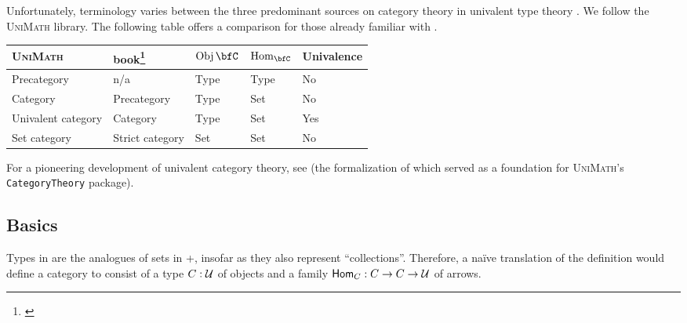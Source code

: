 \documentclass[a5paper]{article}
\newcommand{\software}[1]{{\textsc{#1}}\index{#1}}
\newcommand{\UniMath}{\software{UniMath}}
\begin{document}
Unfortunately, terminology varies between the three predominant sources on
category theory in univalent type theory \cite{book} \cite{unimath}
\cite{hott-lib}. We follow the \UniMath{} library. The
following table offers a comparison for those already familiar with \cite{book}.
\begin{center}
  \begin{tabular}{| l | l | l | l | l |}
    \hline
    \UniMath{} & \HoTT{} book\footnote{\cite{book}} & $\Obj\bfC$ & $\Hom_{\bfC}$ & Univalence \\ \hline
    Precategory                  & n/a             & Type & Type  & No \\
    Category                     & Precategory     & Type & Set   & No \\
    Univalent category           & Category        & Type & Set   & Yes \\
    Set category                 & Strict category & Set  & Set   & No \\
    \hline
  \end{tabular}
\end{center}
For a pioneering development of univalent category theory, see \cite{rezk} (the
formalization of which served as a foundation for \UniMath{}'s
\texttt{CategoryTheory} package). 

\subsection{Basics}
\label{subsec:basics}

Types in \UTT{} are the analogues of sets in \ZFC{}+\FOL{}, insofar as they also
represent ``collections''. Therefore, a naïve translation of the definition
would define a category to consist of a type $C:\mathcal{U}$ of objects and a
family $\mathsf{Hom}_{C}:C\to C\to \mathcal{U}$ of arrows.
\end{document}
